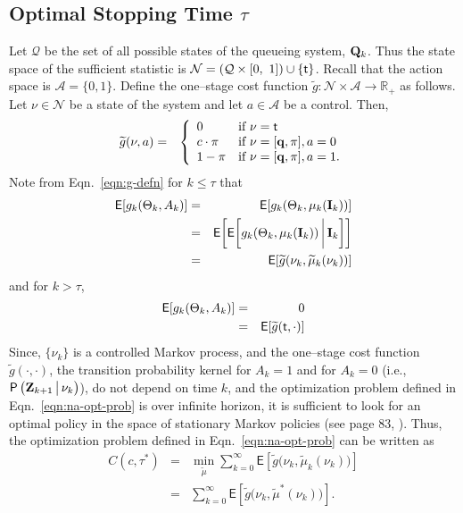 \documentclass[acmtosn]{acmtrans2m}
\newcommand{\prob}[1]{\mathsf{P}\left(#1\right)}
\newcommand{\EXP}[1]{\mathsf{E}\!\left[#1\right]}
\newcommand{\nn}{\nonumber \\}
{\theorembodyfont{\rmfamily}
\newtheorem{remarks}{Remark}[section]} \newtheorem{theorem}{Theorem}
\begin{document}
\subsection{Optimal Stopping Time $\tau$}
\label{subsec:optimal-stopping-time}
Let $\mathcal{Q}$ be the set of all possible states of the queueing system, ${\bf Q}_k$. 
Thus the state space of the sufficient statistic is $\mathcal{N} = 
\left(\mathcal{Q}\times[0,\ 1]\right)\cup\{{\sf t}\}$. Recall that the action
space is $\mathcal{A} = \{0,1\}$. Define the one--stage cost function 
$\widetilde{g}:\mathcal{N} \times \mathcal{A} \to \mathbb{R}_+$ as follows. Let 
$\nu \in \mathcal{N}$ be a state of the system and let $a \in \mathcal{A}$ 
be a control. Then,
\begin{eqnarray*} 
\widetilde{g}(\nu,a) & = & 
\left\{
\begin{array}{ll}
    0 & \text{if} \ \nu =    {\sf t}\\
  c\cdot \pi & \text{if} \ \nu = [{\bf q}, \pi], a = 0\\
1-\pi & \text{if} \ \nu = [{\bf q}, \pi], a = 1.
\end{array}
\right.
\end{eqnarray*}
Note from Eqn.~\ref{eqn:g-defn} for $k \leqslant \tau$ that 
\begin{eqnarray*}
\EXP{g_k(\Theta_k,A_k)}
 & = & \EXP{g_k(\Theta_k,\mu_k({\bf I}_k))}\\ 
 & = & \EXP{\EXP{g_k(\Theta_k,\mu_k({\bf I}_k)) \bigg\arrowvert {\bf I}_k}}\\ 
 & = & \EXP{\widetilde{g}(\nu_k,\widetilde{\mu}_k(\nu_k)) } 
\end{eqnarray*}
and for $k > \tau$,
\begin{eqnarray*}
\EXP{g_k(\Theta_k,A_k)}
& = & 0 \nn 
& = & \EXP{\widetilde{g}({\sf t},\cdot)} 
\end{eqnarray*}
Since, $\{\nu_k\}$ is a controlled Markov process, and the one--stage cost
function $\widetilde{g}(\cdot,\cdot)$, the transition probability kernel for $A_k=1$
and for $A_k = 0$ (i.e., $\prob{{\bf Z}_{k+1}\big\arrowvert \nu_k}$), do not 
depend on time $k$, and the optimization problem defined in Eqn.~\ref{eqn:na-opt-prob} 
is over infinite horizon, it is sufficient 
to look for an optimal policy in the 
space of stationary Markov policies 
(see page 83, \cite{books.bertsekas00b}).
Thus, the optimization problem defined in Eqn.~\ref{eqn:na-opt-prob} can be written as 
\begin{eqnarray} 
 C(c,\tau^*) & = &  \min_{\widetilde{\mu}}\sum_{k=0}^\infty {\mathsf E}\left[\widetilde{g}\big(\nu_k,\widetilde{\mu}_k(\nu_k)\big)\right]\nn
  & = &  \sum_{k=0}^\infty {\mathsf E}\left[\widetilde{g}\big(\nu_k,\widetilde{\mu}^*(\nu_k)\big)\right]. 
\end{eqnarray}
\end{document}
